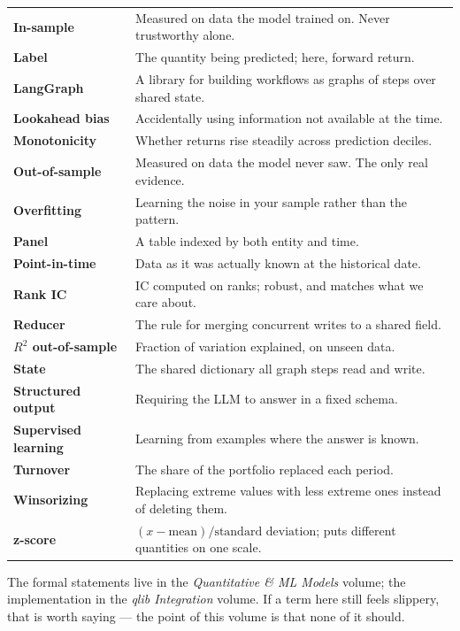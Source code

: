 \documentclass[11pt]{article}
\begin{document}
\begin{center}
\begin{tabular}{@{}>{\bfseries\color{navy}}l p{10.0cm}@{}}
In-sample & Measured on data the model trained on. Never trustworthy alone. \\
Label & The quantity being predicted; here, forward return. \\
LangGraph & A library for building workflows as graphs of steps over shared state. \\
Lookahead bias & Accidentally using information not available at the time. \\
Monotonicity & Whether returns rise steadily across prediction deciles. \\
Out-of-sample & Measured on data the model never saw. The only real evidence. \\
Overfitting & Learning the noise in your sample rather than the pattern. \\
Panel & A table indexed by both entity and time. \\
Point-in-time & Data as it was actually known at the historical date. \\
Rank IC & IC computed on ranks; robust, and matches what we care about. \\
Reducer & The rule for merging concurrent writes to a shared field. \\
$R^2$ out-of-sample & Fraction of variation explained, on unseen data. \\
State & The shared dictionary all graph steps read and write. \\
Structured output & Requiring the LLM to answer in a fixed schema. \\
Supervised learning & Learning from examples where the answer is known. \\
Turnover & The share of the portfolio replaced each period. \\
Winsorizing & Replacing extreme values with less extreme ones instead of deleting them. \\
z-score & $(x-\text{mean})/\text{standard deviation}$; puts different quantities on one scale. \\
\bottomrule
\end{tabular}
\end{center}

\vfill
\begin{center}\small\color{muted}
The formal statements live in the \emph{Quantitative \& ML Models} volume; the
implementation in the \emph{qlib Integration} volume. If a term here still feels
slippery, that is worth saying --- the point of this volume is that none of it should.
\end{center}
\end{document}
